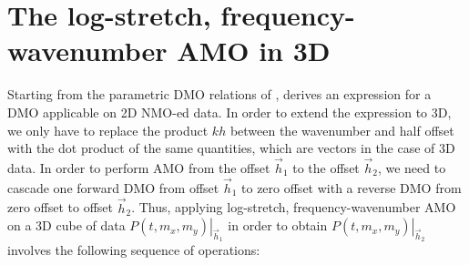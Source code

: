 \section{The log-stretch, frequency-wavenumber AMO in 3D}
Starting from the parametric DMO relations of ,
 derives an expression for a DMO applicable on 2D NMO-ed
data. In order to extend the expression to 3D, we only have to replace
the product $kh$ between the wavenumber and half offset with the dot
product of the same quantities, which are vectors in the case of 3D
data. In order to perform AMO from the offset $\vec h_1$ to the offset
$\vec h_2$, we need to cascade one forward DMO from offset $\vec h_1$ to
zero offset with a reverse DMO from zero offset to offset $\vec
h_2$. Thus, applying log-stretch, frequency-wavenumber AMO on a 3D
cube of data $\left. {P\left( {t,m_x ,m_y } \right)} \right|_{\vec h_1
}$ in order to obtain $\left. {P\left( {t,m_x ,m_y } \right)}
\right|_{\vec h_2 }$ involves the following sequence of operations:
